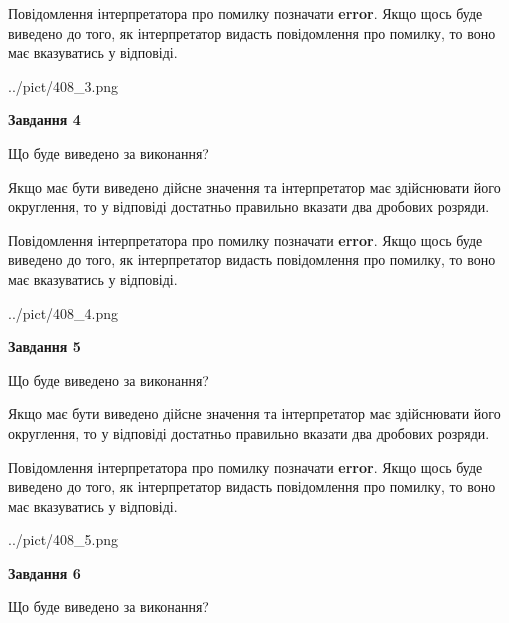 \documentclass[12pt, ukrainian]{article}
\begin{document}
{\begin {Large}
Повідомлення інтерпретатора про помилку позначати \textbf{error}.
Якщо щось буде виведено до того, як інтерпретатор видасть повідомлення про помилку, 
то воно має вказуватись у відповіді. \par

\begin{center}
	{../pict/408_3.png}
\end{center}
\newpage

{\begin {center}\textbf{Завдання 4}\end {center}}\par
Що буде виведено за виконання? \par

Якщо має бути виведено дійсне значення та інтерпретатор має здійснювати його округлення, 
то у відповіді достатньо правильно вказати два дробових розряди.

Повідомлення інтерпретатора про помилку позначати \textbf{error}.
Якщо щось буде виведено до того, як інтерпретатор видасть повідомлення про помилку, 
то воно має вказуватись у відповіді. \par

\begin{center}
	{../pict/408_4.png}
\end{center}
\newpage

{\begin {center}\textbf{Завдання 5}\end {center}}\par
Що буде виведено за виконання? \par

Якщо має бути виведено дійсне значення та інтерпретатор має здійснювати його округлення, 
то у відповіді достатньо правильно вказати два дробових розряди.

Повідомлення інтерпретатора про помилку позначати \textbf{error}.
Якщо щось буде виведено до того, як інтерпретатор видасть повідомлення про помилку, 
то воно має вказуватись у відповіді. \par

\begin{center}
	{../pict/408_5.png}
\end{center}
\newpage

{\begin {center}\textbf{Завдання 6}\end {center}}\par
Що буде виведено за виконання? \par


\end{Large}}
\end{document}
